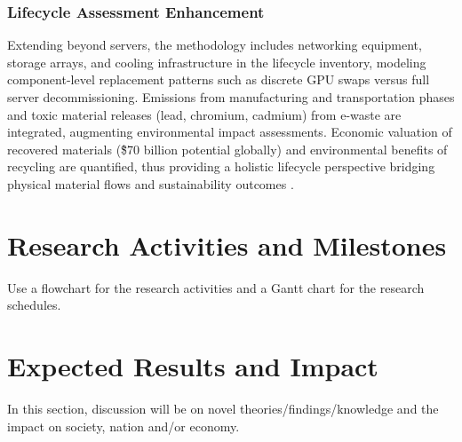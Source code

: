 \documentclass[a4paper, 12pt]{article}
\begin{document}
\subsubsection{Lifecycle Assessment Enhancement}
Extending beyond servers, the methodology includes networking equipment, storage arrays, and cooling infrastructure in the lifecycle inventory, modeling component-level replacement patterns such as discrete GPU swaps versus full server decommissioning. Emissions from manufacturing and transportation phases and toxic material releases (lead, chromium, cadmium) from e-waste are integrated, augmenting environmental impact assessments. Economic valuation of recovered materials (\~\$70 billion potential globally) and environmental benefits of recycling are quantified, thus providing a holistic lifecycle perspective bridging physical material flows and sustainability outcomes \citep{wang_2024_ewaste}.

\section{Research Activities and Milestones}
Use a flowchart for the research activities and a Gantt chart for the research schedules. 

\section{Expected Results and Impact}
In this section, discussion will be on novel theories/findings/knowledge and the impact on society, nation and/or economy.

\printbibliography
\end{document}
